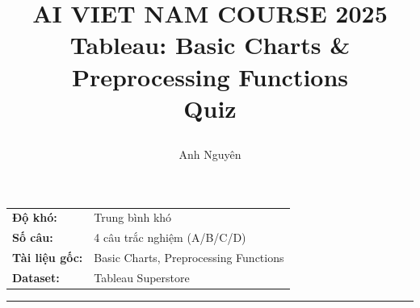 \documentclass[12pt]{article}
\title{
  \begin{center}
    \Large {AI VIET NAM COURSE 2025}\\[.5ex]
    \Huge \textbf{Tableau: Basic Charts \& Preprocessing Functions}\\[.5ex]
    \large Quiz
  \end{center}
}
\author{Anh Nguyên}
\date{}
\begin{document}
\maketitle

\begin{center}
\begin{tabular}{ll}
\textbf{Độ khó:} & Trung bình khó \\
\textbf{Số câu:} & 4 câu trắc nghiệm (A/B/C/D) \\
\textbf{Tài liệu gốc:} & Basic Charts, Preprocessing Functions \\
\textbf{Dataset:} & Tableau Superstore \\
\end{tabular}
\end{center}

\vspace{1em}
\hrule
\vspace{1em}
\end{document}
